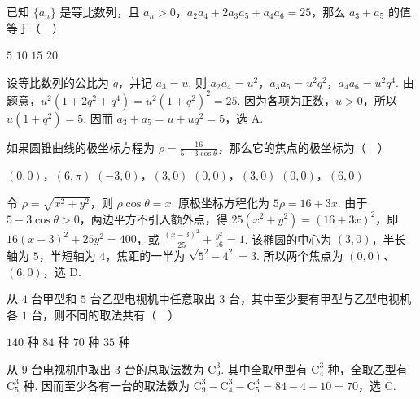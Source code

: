 \begin{problem}
已知 \(\{a_n\}\) 是等比数列，且 \(a_n>0\)，\(a_2a_4+2a_3a_5+a_4a_6=25\)，那么 \(a_3+a_5\) 的值等于（\(\quad\)）

\choices
    {\(5\)}
    {\(10\)}
    {\(15\)}
    {\(20\)}


\begin{solution}
设等比数列的公比为 \(q\)，并记 \(a_3=u\). 则 \(a_2a_4=u^2\)，\(a_3a_5=u^2q^2\)，\(a_4a_6=u^2q^4\). 由题意，\(u^2\left(1+2q^2+q^4\right)=u^2\left(1+q^2\right)^2=25\). 因为各项为正数，\(u>0\)，所以 \(u(1+q^2)=5\). 因而 \(a_3+a_5=u+uq^2=5\)，选 A.
\end{solution}
\end{problem}

\begin{problem}
如果圆锥曲线的极坐标方程为 \(\rho=\frac{16}{5-3\cos\theta}\)，那么它的焦点的极坐标为（\(\quad\)）

\choices
    {\(\left(0,0\right)\)，\(\left(6,\pi\right)\)}
    {\(\left(-3,0\right)\)，\(\left(3,0\right)\)}
    {\(\left(0,0\right)\)，\(\left(3,0\right)\)}
    {\(\left(0,0\right)\)，\(\left(6,0\right)\)}


\begin{solution}
令 \(\rho=\sqrt{x^2+y^2}\)，则 \(\rho\cos\theta=x\). 原极坐标方程化为 \(5\rho=16+3x\). 由于 \(5-3\cos\theta>0\)，两边平方不引入额外点，得 \(25(x^2+y^2)=(16+3x)^2\)，即 \(16(x-3)^2+25y^2=400\)，或 \(\frac{(x-3)^2}{25}+\frac{y^2}{16}=1\). 该椭圆的中心为 \((3,0)\)，半长轴为 \(5\)，半短轴为 \(4\)，焦距的一半为 \(\sqrt{5^2-4^2}=3\). 所以两个焦点为 \((0,0)\)、\((6,0)\)，选 D.
\end{solution}
\end{problem}

\begin{problem}
从 \(4\) 台甲型和 \(5\) 台乙型电视机中任意取出 \(3\) 台，其中至少要有甲型与乙型电视机各 \(1\) 台，则不同的取法共有（\(\quad\)）

\choices
    {\(140\) 种}
    {\(84\) 种}
    {\(70\) 种}
    {\(35\) 种}


\begin{solution}
从 \(9\) 台电视机中取出 \(3\) 台的总取法数为 \(\mathrm C_9^3\). 其中全取甲型有 \(\mathrm C_4^3\) 种，全取乙型有 \(\mathrm C_5^3\) 种. 因而至少各有一台的取法数为 \(\mathrm C_9^3-\mathrm C_4^3-\mathrm C_5^3=84-4-10=70\)，选 C.
\end{solution}
\end{problem}

